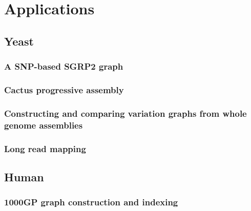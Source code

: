 \chapter{Applications}

\ifpdf
    \graphicspath{{Chapter3/Figs/Raster/}{Chapter3/Figs/PDF/}{Chapter3/Figs/}}
\else
    \graphicspath{{Chapter3/Figs/Vector/}{Chapter3/Figs/}}
\fi


\section{Yeast}

\subsection{A SNP-based SGRP2 graph}

\subsection{Cactus progressive assembly}

\subsection{Constructing and comparing variation graphs from whole genome assemblies}

\subsection{Long read mapping} %

\section{Human}

\subsection{1000GP graph construction and indexing}


